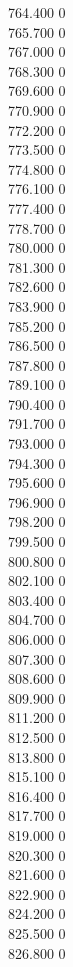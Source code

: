 { 764.400	0 \\
 765.700	0 \\
 767.000	0 \\
 768.300	0 \\
 769.600	0 \\
 770.900	0 \\
 772.200	0 \\
 773.500	0 \\
 774.800	0 \\
 776.100	0 \\
 777.400	0 \\
 778.700	0 \\
 780.000	0 \\
 781.300	0 \\
 782.600	0 \\
 783.900	0 \\
 785.200	0 \\
 786.500	0 \\
 787.800	0 \\
 789.100	0 \\
 790.400	0 \\
 791.700	0 \\
 793.000	0 \\
 794.300	0 \\
 795.600	0 \\
 796.900	0 \\
 798.200	0 \\
 799.500	0 \\
 800.800	0 \\
 802.100	0 \\
 803.400	0 \\
 804.700	0 \\
 806.000	0 \\
 807.300	0 \\
 808.600	0 \\
 809.900	0 \\
 811.200	0 \\
 812.500	0 \\
 813.800	0 \\
 815.100	0 \\
 816.400	0 \\
 817.700	0 \\
 819.000	0 \\
 820.300	0 \\
 821.600	0 \\
 822.900	0 \\
 824.200	0 \\
 825.500	0 \\
 826.800	0 \\
}
